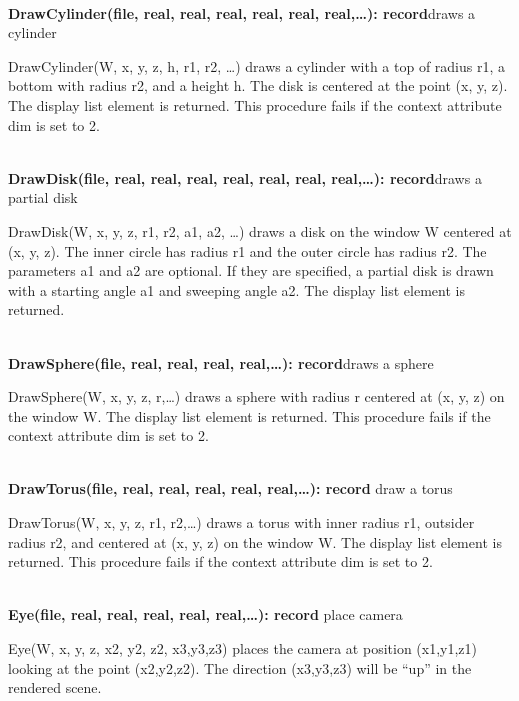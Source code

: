 \documentclass[letterpaper]{article}
\begin{document}
{\noindent\hrulefill\\
\noindent\textsf{\textbf{DrawCylinder(file, real, real, real, real,
real, real,{\dots}): record}}\hfill draws a cylinder


\bigskip

\textsf{DrawCylinder(W, x, y, z, h, r1, r2, {\dots})} draws a
cylinder with a top of radius r1, a bottom with radius r2, and a
height h. The disk is centered at the point (x, y, z). The display
list element is returned. This procedure fails if the context
attribute dim is set to 2.

\noindent\hrulefill\\
\noindent\textsf{\textbf{DrawDisk(file, real, real, real, real, real,
	real, real,\dots): record}}\hfill draws a partial disk


\bigskip

\textsf{DrawDisk(W, x, y, z, r1, r2, a1, a2, {\dots})} draws
a disk on the window W centered at (x, y, z). The inner circle has
radius r1 and the outer circle has radius r2. The parameters a1 and a2
are optional. If they are specified, a partial disk is drawn with a
starting angle a1 and sweeping angle a2. The display list element is
returned.

\noindent\hrulefill\\
\noindent\textsf{\textbf{DrawSphere(file, real, real, real,
real,{\dots}): record}}\hfill draws a sphere

\textsf{DrawSphere(W, x, y, z, r,{\dots})} draws a sphere with
radius r centered at (x, y, z) on the window W. The display list
element is returned. This procedure fails if the context attribute dim
is set to 2.

\noindent\hrulefill\\
\noindent\textsf{\textbf{DrawTorus(file, real, real, real, real, real,{\dots}): record}}
\hfill draw a torus


\bigskip

\textsf{DrawTorus(W, x, y, z, r1, r2,{\dots})} draws a torus with
inner radius r1, outsider radius r2, and centered at (x, y, z) on the
window W. The display list element is returned. This procedure fails
if the context attribute dim is set to 2.

\noindent\hrulefill\\
\noindent\textsf{\textbf{Eye(file, real, real, real, real, real,{\dots}): record}} \hfill place camera


\bigskip

\textsf{Eye(W, x, y, z, x2, y2, z2, x3,y3,z3)} places the camera at
position (x1,y1,z1) looking at the point (x2,y2,z2). The direction
(x3,y3,z3) will be ``up'' in the rendered scene.

}
\end{document}

